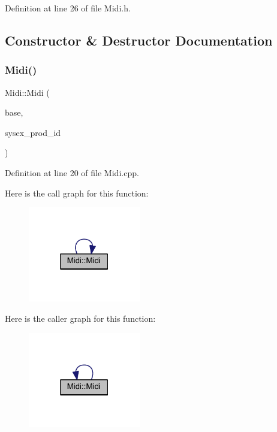 Definition at line 26 of file Midi.\+h.



\subsection{Constructor \& Destructor Documentation}
\mbox{\label{class_midi_aaf0c677f66873f3743cf41e655309df9}} 
\subsubsection{\texorpdfstring{Midi()}{Midi()}}
{\footnotesize\ttfamily Midi\+::\+Midi (\begin{DoxyParamCaption}\item[{\hyperlink{class_midi_base}{Midi\+Base} $\ast$}]{base,  }\item[{unsigned char}]{sysex\+\_\+prod\+\_\+id }\end{DoxyParamCaption})}



Definition at line 20 of file Midi.\+cpp.

Here is the call graph for this function\+:
\nopagebreak
\begin{figure}[H]
\begin{center}
\leavevmode
\includegraphics[width=139pt]{class_midi_aaf0c677f66873f3743cf41e655309df9_cgraph}
\end{center}
\end{figure}
Here is the caller graph for this function\+:
\nopagebreak
\begin{figure}[H]
\begin{center}
\leavevmode
\includegraphics[width=139pt]{class_midi_aaf0c677f66873f3743cf41e655309df9_icgraph}
\end{center}
\end{figure}
\mbox{\label{class_midi_a3caa6150d8a34528c034eac4697e36b6}} 
